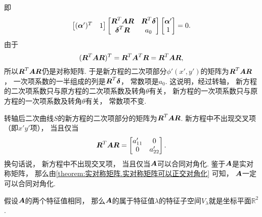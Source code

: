 即\begin{equation*}
	\begin{bmatrix}
		(\boldsymbol\alpha')^T & 1
	\end{bmatrix}
	\begin{bmatrix}
		\boldsymbol{R}^T \boldsymbol{A} \boldsymbol{R} & \boldsymbol{R}^T \boldsymbol\delta \\
		\boldsymbol\delta^T \boldsymbol{R} & a_0
	\end{bmatrix}
	\begin{bmatrix}
		\boldsymbol\alpha' \\ 1
	\end{bmatrix}
	= 0.
\end{equation*}
由于\begin{equation*}
	(\boldsymbol{R}^T \boldsymbol{A} \boldsymbol{R})^T
	= \boldsymbol{R}^T \boldsymbol{A}^T \boldsymbol{R}
	= \boldsymbol{R}^T \boldsymbol{A} \boldsymbol{R},
\end{equation*}
所以\(\boldsymbol{R}^T \boldsymbol{A} \boldsymbol{R}\)仍是对称矩阵.
于是新方程的二次项部分\(\phi'(x',y')\)的矩阵为\(\boldsymbol{R}^T \boldsymbol{A} \boldsymbol{R}\)，
一次项系数的一半组成的列是\(\boldsymbol{R}^T \boldsymbol\delta\)，
常数项是\(a_0\).
这说明，经过转轴，
新方程的二次项系数只与原方程的二次项系数及转角\(\theta\)有关，
新方程的一次项系数只与原方程的一次项系数及转角\(\theta\)有关，
常数项不变.

转轴后二次曲线\(S\)的新方程的二次项部分的矩阵为\(\boldsymbol{R}^T \boldsymbol{A} \boldsymbol{R}\).
新方程中不出现交叉项（即\(x' y'\)项），
当且仅当\begin{equation*}
	\boldsymbol{R}^T \boldsymbol{A} \boldsymbol{R}
	= \begin{bmatrix}
		a'_{11} & 0 \\
		0 & a'_{22}
	\end{bmatrix}.
\end{equation*}
换句话说，
新方程中不出现交叉项，
当且仅当\(\boldsymbol{A}\)可以合同对角化.
鉴于\(\boldsymbol{A}\)是实对称矩阵，
那么由\cref{theorem:实对称矩阵.实对称矩阵可以正交对角化} 可知，
\(\boldsymbol{A}\)一定可以合同对角化.

假设\(\boldsymbol{A}\)的两个特征值相同，
那么\(\boldsymbol{A}\)的属于特征值\(\lambda\)的特征子空间\(V_\lambda\)就是坐标平面\(\mathbb{R}^2\).

